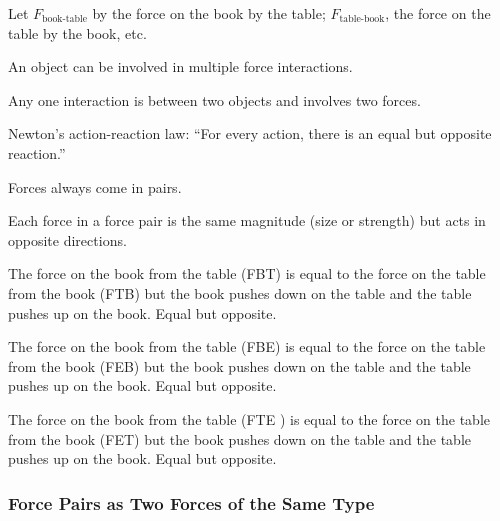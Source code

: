 \documentclass[dvipsnames]{article}
\begin{document}
Let $F_\text{book-table}$ by the force on the book by the table; $F_\text{table-book}$, the force on the table by the book, etc.

\begin{center}
\end{center}

An object can be involved in multiple force interactions.

Any one interaction is between two objects and involves two forces.

Newton's action-reaction law: ``For every action, there is an equal but opposite reaction.''

Forces always come in pairs.

Each force in a force pair is the same magnitude (size or strength) but acts in opposite directions.

The force on the book from the table (FBT) is equal  to the force on the table from the book (FTB) but the book pushes down on the table and the table pushes up on the book. Equal but opposite.

The force on the book from the table (FBE) is equal  to the force on the table from the book (FEB) but the book pushes down on the table and the table pushes up on the book. Equal but opposite.

The force on the book from the table (FTE ) is equal  to the force on the table from the book (FET) but the book pushes down on the table and the table pushes up on the book. Equal but opposite.

\subsubsection{Force Pairs as Two Forces of the Same Type}
\end{document}
